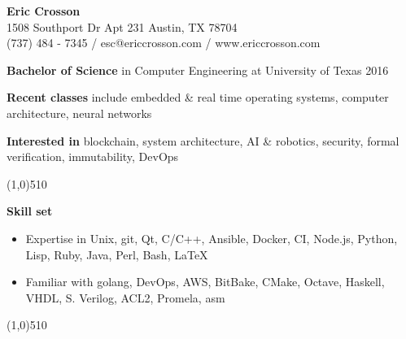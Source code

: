 \documentclass{report}
\newcommand{\cut}{\begin{center} \line(1,0){510} \end{center}}
\begin{document}
\pagestyle{empty}
\setlength\parindent{0pt}

\begin{center}
  \textbf{Eric Crosson} \\
  1508 Southport Dr Apt 231 Austin, TX 78704 \\
  (737) 484 - 7345 / esc@ericcrosson.com / www.ericcrosson.com
\end{center}

\textbf{Bachelor of Science} in Computer Engineering at University of Texas
2016

\vspace{1mm}

\textbf{Recent classes} include embedded \& real time operating systems,
computer architecture, neural networks

\vspace{1mm}

\textbf{Interested in} blockchain, system architecture, AI \& robotics, security, formal verification, immutability, DevOps

\cut{}

\textbf{Skill set}
\begin{itemize}[label=$\circ$]
\item Expertise in Unix, git, Qt, C/C++, Ansible, Docker, CI, Node.js, Python, Lisp, Ruby, Java, Perl, Bash,
  \LaTeX{}
\item Familiar with golang, DevOps, AWS, BitBake, CMake, Octave, Haskell, VHDL, S. Verilog, ACL2, Promela, asm
\end{itemize}

\cut{}
\end{document}
